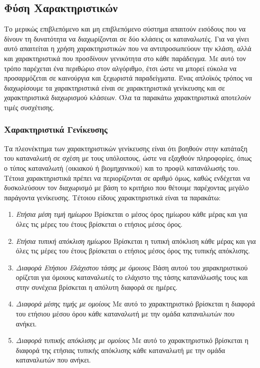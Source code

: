 \subsection{Φύση Χαρακτηριστικών}
Το μερικώς επιβλεπόμενο και μη επιβλεπόμενο σύστημα απαιτούν εισόδους που να δίνουν τη δυνατότητα να διαχωρίζονται σε δύο κλάσεις οι καταναλωτές. Για να γίνει αυτό απαιτείται η χρήση χαρακτηριστικών που να αντιπροσωπεύουν την κλάση, αλλά και χαρακτηριστικά που προσδίνουν γενικότητα στο κάθε παράδειγμα. Με αυτό τον τρόπο παρέχεται ένα περιθώριο στον αλγόριθμο, έτσι ώστε να μπορεί εύκολα να προσαρμόζεται σε καινούργια και ξεχωριστά παραδείγματα. Ένας απλοϊκός τρόπος να διαχωρίσουμε τα χαρακτηριστικά είναι σε χαρακτηριστικά γενίκευσης και σε χαρακτηριστικά διαχωρισμού κλάσεων. Όλα τα παρακάτω χαρακτηριστικά αποτελούν τιμές συσχέτισης.
\subsubsection{Χαρακτηριστικά Γενίκευσης} 
Τα πλεονέκτημα των χαρακτηριστικών γενίκευσης είναι ότι βοηθούν στην κατάταξη του καταναλωτή σε σχέση με τους υπόλοιπους, ώστε να εξαχθούν πληροφορίες, όπως ο τύπος καταναλωτή (οικιακού ή βιομηχανικού) και το προφίλ κατανάλωσής του. Τέτοια χαρακτηριστικά πρέπει να περιορίζονται σε αριθμό όμως, καθώς ενδέχεται να δυσκολεύσουν τον διαχωρισμό με βάση το κριτήριο που θέτουμε παρέχοντας μεγάλο παράγοντα γενίκευσης.  Τέτοιου είδους χαρακτηριστικά είναι τα παρακάτω:
\begin{enumerate}
\item{\textit{Ετήσια μέση τιμή ημίωρου}} Βρίσκεται ο μέσος όρος ημίωρου κάθε μέρας και για όλες τις μέρες του έτους βρίσκεται ο ετήσιος μέσος όρος.
\item{\textit{Ετήσια τυπική απόκλιση ημίωρου}} Βρίσκεται η τυπική απόκλιση κάθε μέρας και για όλες τις μέρες του έτους βρίσκεται ο ετήσιος μέσος όρος της τυπικής απόκλισης.
\item{\textit{Διαφορά Ετήσιου Ελάχιστου τάσης με όμοιους}} Βάση αυτού του χαρακηριστικού ορίζεται για όμοιους καταναλωτές το ελάχιστο της τάσης κατανάλωσής τους και στην συνέχεια βρίσκεται η απόλυτη διαφορά σε  ημέρες.
\item{\textit{Διαφορά μέσης τιμής με ομοίους}} Με αυτό το χαρακτηριστικό βρίσκεται η διαφορά του ετήσιου μέσου όρου κάθε καταναλωτή με την ομάδα καταναλωτών που ανήκει.
\item{\textit{Διαφορά τυπικής απόκλισης με ομοίους}} Με αυτό το χαρακτηριστικό βρίσκεται η διαφορά της ετήσιας τυπικής απόκλισης κάθε καταναλωτή με την ομάδα καταναλωτών που ανήκει.
\end{enumerate}
